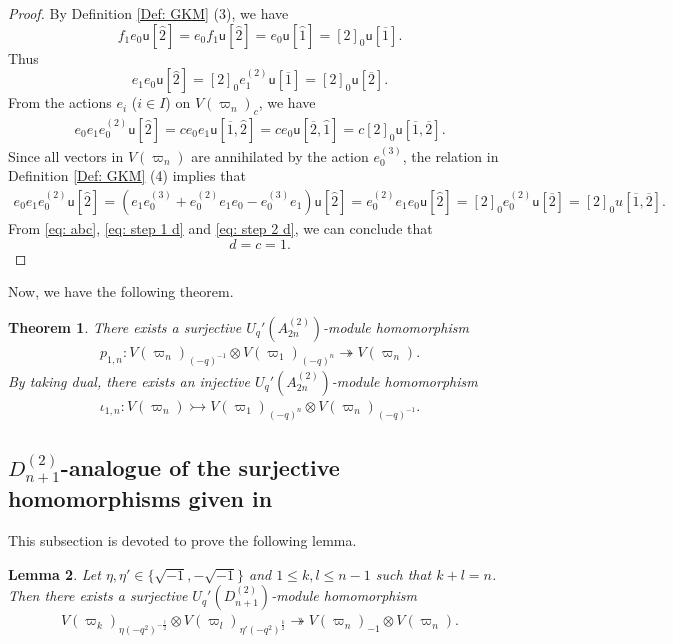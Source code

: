 \documentclass[11pt, leqno]{amsart}
\newtheorem{theorem}{Theorem}[section]
\newtheorem{lemma}[theorem]{Lemma}
\theoremstyle{definition}
\numberwithin{equation}{section}
\begin{document}
\begin{proof}
By Definition \ref{Def: GKM} (3), we have
$$f_1e_0 \mathsf{u}[\widehat{2}]= e_0f_1\mathsf{u}[\widehat{2}]= e_0 \mathsf{u}[\widehat{1}]=[2]_0\mathsf{u}[\overline{1}].$$
Thus
$$e_1e_0\mathsf{u}[\widehat{2}]=[2]_0e_1^{(2)}\mathsf{u}[\overline{1}]=[2]_0\mathsf{u}[\overline{2}].$$
From the actions $e_i$ ($i \in I$) on $V({\varpi}_n)_c$, we have
\begin{align}\label{eq: step 1 d}
e_0e_1e_0^{(2)}\mathsf{u}[\widehat{2}]=ce_0e_1 \mathsf{u}[\overline{1},\widehat{2}]=ce_0\mathsf{u}[\overline{2},\widehat{1}]
=c[2]_0\mathsf{u}[\overline{1},\overline{2}].
\end{align}
Since all vectors in $V({\varpi}_n)$ are annihilated by the action $e_0^{(3)}$, the relation in Definition \ref{Def: GKM} (4) implies that
\begin{align}\label{eq: step 2 d}
e_0e_1e_0^{(2)}\mathsf{u}[\widehat{2}] = (e_1e_0^{(3)}+e_0^{(2)}e_1e_0-e_0^{(3)}e_1)\mathsf{u}[\widehat{2}]
=e_0^{(2)}e_1e_0\mathsf{u}[\widehat{2}] =
[2]_0e_0^{(2)}\mathsf{u}[\overline{2}]
=[2]_0u[\overline{1},\overline{2}].
\end{align}
From \eqref{eq: abc}, \eqref{eq: step 1 d} and \eqref{eq: step 2 d}, we can conclude that
$$ d=c=1.$$
\end{proof}

Now, we have the following theorem.

\begin{theorem}There exists a surjective $U_q'(A^{(2)}_{2n})$-module homomorphism
\begin{align} \label{eq: p 1nn}
  p_{1,n} \colon V(\varpi_n)_{(-q)^{-1}} \otimes V(\varpi_1)_{(-q)^{n}}
  \twoheadrightarrow V(\varpi_{n}).
  \end{align}
By taking dual, there exists an injective $U_q'(A^{(2)}_{2n})$-module homomorphism
\begin{align}\label{eq: iota 1nn}
  \iota_{1,n} \colon V(\varpi_n)  \rightarrowtail V(\varpi_1)_{(-q)^{n}}
  \otimes V(\varpi_n)_{(-q)^{-1}}.
  \end{align}
\end{theorem}

\subsection{$D^{(2)}_{n+1}$-analogue of the surjective homomorphisms given in \cite[(A.17)]{KKK13b}} This subsection is devoted to prove the following
lemma.

\begin{lemma} \label{lemma: k,l to n,n}
Let  $\eta, \eta' \in  \{ \sqrt{-1},-\sqrt{-1} \}$ and $1 \le k,l
\leq n-1$ such that $k+ l = n$. Then there exists a surjective
$U_q'(D^{(2)}_{n+1})$-module homomorphism
\begin{align*}
    V(\varpi_k)_{\eta{(-q^2)}^{-\frac{l}{2}}} \otimes V(\varpi_l)_{\eta'{(-q^2)}^{\frac{k}{2}}}
    \twoheadrightarrow V(\varpi_{n})_{-1} \otimes V(\varpi_{n}).
\end{align*}
\end{lemma}
\end{document}
